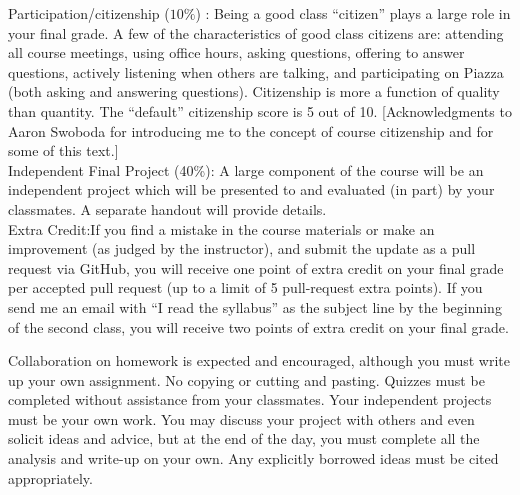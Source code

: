 \documentclass[10pt]{article}
\begin{document}
\noindent Participation/citizenship ($10\%$) :
Being a good class ``citizen'' plays a large role in your final grade. A few of the characteristics of good class citizens are: attending all course meetings, using office hours, asking questions, offering to answer questions, actively listening when others are talking, and participating on Piazza (both asking and answering questions). Citizenship is more a function of quality than quantity. The ``default'' citizenship score is 5 out of 10. [Acknowledgments to Aaron Swoboda for introducing me to the concept of course citizenship and for some of this text.] \\


\noindent Independent Final Project (40\%): A large component of the course will be an independent project which will be presented to and evaluated (in part) by your classmates. A separate handout will provide details. \\


\noindent Extra Credit:If you find a mistake in the course materials or make an improvement (as judged by the instructor), and submit the update as a pull request via GitHub, you will receive one point of extra credit on your final grade per accepted pull request (up to a limit of 5 pull-request extra points).  If you send me an email with ``I read the syllabus'' as the subject line by the beginning of the second class, you will receive two points of extra credit on your final grade. 

\bigskip
{}

Collaboration on homework is expected and encouraged, although you must write up your own assignment. No copying or cutting and pasting. Quizzes must be completed without assistance from your classmates. Your independent projects must be your own work. You may discuss your project with others and even solicit ideas and advice, but at the end of the day, you must complete all the analysis and write-up on your own. Any explicitly borrowed ideas must be cited appropriately.
\end{document}
